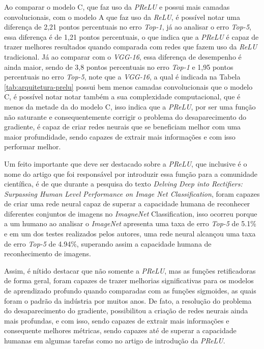 Ao comparar o modelo C, que faz uso da \textit{PReLU} e possui mais camadas convolucionais, com o modelo A que faz uso da \textit{ReLU}, é possível notar uma diferença de 2,21 pontos percentuais no erro \textit{Top-1}, já ao analisar o erro \textit{Top-5}, essa diferença é de 1,21 pontos percentuais, o que indica que a \textit{PReLU} é capaz de trazer melhores resultados quando comparada com redes que fazem uso da \textit{ReLU} tradicional. Já ao comparar com o \textit{VGG-16}, essa diferença de desempenho é ainda maior, sendo de 3,8 pontos percentuais no erro \textit{Top-1} e 1,95 pontos percentuais no erro \textit{Top-5}, note que a \textit{VGG-16}, a qual é indicada na Tabela \ref{tab:arquitetura-prelu} possui bem menos camadas convolucionais que o modelo C, é possível notar notar também a sua complexidade computacional, que é menos da metade da do modelo C, isso indica que a \textit{PReLU}, por ser uma função não saturante e consequentemente corrigir o problema do desaparecimento do gradiente, é capaz de criar redes neurais que se beneficiam melhor com uma maior profundidade, sendo capazes de extrair mais informações e com isso performar melhor.

Um feito importante que deve ser destacado sobre a \textit{PReLU}, que inclusive é o nome do artigo que foi responsável por introduzir essa função para a comunidade científica, é de que durante a pesquisa do texto \textit{Delving Deep into Rectifiers: Surpassing Human Level Performance on Image Net Classification}, \textcite{PReLUArticle} foram capazes de criar uma rede neural capaz de superar a capacidade humana de reconhecer diferentes conjuntos de imagens no \textit{ImagneNet} Classification, isso ocorreu porque a um humano ao analisar o \textit{ImageNet} apresenta uma taxa de erro \textit{Top-5} de 5.1\% e em um dos testes realizados pelos autores, uma rede neural alcançou uma taxa de erro \textit{Top-5} de 4.94\%, superando assim a capacidade humana de reconhecimento de imagens. 

Assim, é nítido destacar que não somente a \textit{PReLU}, mas as funções retificadoras de forma geral, foram capazes de trazer melhorias significativas para os modelos de aprendizado profundo quando comparadas com as funções sigmoides, as quais foram o padrão da indústria por muitos anos. De fato, a resolução do problema do desaparecimento do gradiente, possibilitou a criação de redes neurais ainda mais profundas, e com isso, sendo capazes de extrair mais informações e consequente melhores métricas, sendo capazes até de superar a capacidade humanas em algumas tarefas como no artigo de introdução da \textit{PReLU}.

